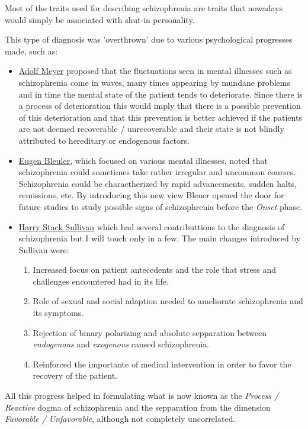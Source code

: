 \documentclass{Paper_Summary}
\begin{document}
    Most of the traits used for describing schizophrenia are traits that nowadays would simply be associated with shut-in personality.

    This type of diagnosis was 'overthrown' due to various psychological progresses made, such as:
    \begin{itemize}
        \item \underline{Adolf Meyer} proposed that the fluctuations seen in mental illnesses such as schizophrenia come in waves, many times appearing by mundane problems and in time the mental state of the patient tends to deteriorate. Since there is a process of deterioration this would imply that there is a possible prevention of this deterioration and that this prevention is better achieved if the patients are not deemed recoverable / unrecoverable and their state is not blindly attributed to hereditary or endogenous factors.
        \item \underline{Eugen Bleuler}, which focused on various mental illnesses, noted that schizophrenia could sometimes take rather irregular and uncommon courses. Schizophrenia could be charactherized by rapid advancements, sudden halts, remissions, etc. By introducing this new view Bleuer opened the door for future studies to study possible signs of schizophrenia before the \emph{Onset} phase.
        \item \underline{Harry  Stack  Sullivan} which had several contributtions to the diagnosis of schizophrenia but I will touch only in a few. The main changes introduced by Sullivan were:
        \begin{enumerate}
            \item Increased focus on patient antecedents and the role that stress and challenges encountered had in its life.
            \item Role of sexual and social adaption needed to ameliorate schizophrenia and its symptoms.
            \item Rejection of binary polarizing and absolute sepparation between \emph{endogenous} and \emph{exogenous} caused schizophrenia.
            \item Reinforced the importante of medical intervention in order to favor the recovery of the patient.
        \end{enumerate}
    \end{itemize}

    All this progress helped in formulating what is now known as the \emph{Process / Reactive} dogma of schizophrenia and the sepparation from the dimension \emph{Favorable / Unfavorable}, although not completely uncorrelated.
\end{document}
